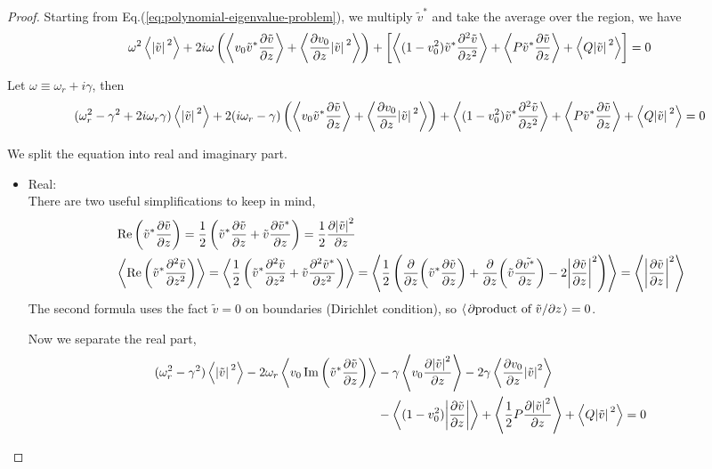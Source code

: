 \documentclass{article}
\theoremstyle{plain}
\theoremstyle{definition}
\theoremstyle{remark}
\theoremstyle{remark}
\begin{document}
\begin{proof}
    Starting from Eq.(\ref{eq:polynomial-eigenvalue-problem}), we multiply $\tilde{v}^*$ and take the average over the region, we have
\[ \omega^2 \expval{\abs*{\tilde{v}}^2} 
+ 2i\omega\left(\expval{v_0\tilde{v}^*\pdv{\tilde{v}}{z}} 
+ \expval{\pdv{v_0}{z}\abs*{\tilde{v}}^2}\right) 
+ \left[ \expval{(1-v_0^2)\tilde{v}^*\pdv[2]{\tilde{v}}{z} }
+ \expval{P\tilde{v}^*\pdv{\tilde{v}}{z} }
+ \expval{Q\abs*{\tilde{v}}^2} \right]
= 0  \]

Let $\omega \equiv \omega_r + i\gamma$, then
\[ (\omega_r^2-\gamma^2+2i\omega_r\gamma) \expval{\abs*{\tilde{v}}^2} 
+ 2(i\omega_r - \gamma)\left(\expval{v_0\tilde{v}^*\pdv{\tilde{v}}{z}} 
+ \expval{\pdv{v_0}{z}\abs*{\tilde{v}}^2}\right) 
+ \expval{(1-v_0^2)\tilde{v}^*\pdv[2]{\tilde{v}}{z} }
+ \expval{P\tilde{v}^*\pdv{\tilde{v}}{z} }
+ \expval{Q\abs*{\tilde{v}}^2}
= 0  \]

We split the equation into real and imaginary part.
\begin{itemize}
    \item Real: \\
    There are two useful simplifications to keep in mind,
    \begin{align*}
        &\Re\left(\tilde{v}^*\pdv{\tilde{v}}{z}\right) 
        = \frac{1}{2}\left(\tilde{v}^*\pdv{\tilde{v}}{z} + \tilde{v}\pdv{\tilde{v}^*}{z}\right) 
        = \frac{1}{2}\pdv{\abs{\tilde{v}}^2}{z} \\
        &\expval{\Re\left(\tilde{v}^*\pdv[2]{\tilde{v}}{z}\right) } 
        = \expval{\frac{1}{2}\left(\tilde{v}^*\pdv[2]{\tilde{v}}{z} + \tilde{v}\pdv[2]{\tilde{v}^*}{z}\right)}
        = \expval{\frac{1}{2}\left( \pdv{z}(\tilde{v}^*\pdv{\tilde{v}}{z}) + \pdv{z}(\tilde{v}\pdv{\tilde{v^*}}{z}) - 2\abs{\pdv{\tilde{v}}{z}}^2 \right)}
        = \expval{\abs{\pdv{\tilde{v}}{z}}^2}
    \end{align*}
    The second formula uses the fact $\tilde{v}=0$ on boundaries (Dirichlet condition), so $\expval{\pdv*{\text{product of }\tilde{v}}{z}} = 0$.

    Now we separate the real part,
    \begin{align*}
        (\omega_r^2-\gamma^2) \expval{\abs*{\tilde{v}}^2} 
        - 2\omega_r\expval{v_0 \Im\left(\tilde{v}^*\pdv{\tilde{v}}{z}\right)} 
        &- \gamma\expval{v_0 \pdv{\abs{\tilde{v}}^2}{z}} 
        - 2\gamma\expval{\pdv{v_0}{z}\abs{\tilde{v}}^2} \\
        &-\expval{(1-v_0^2) \abs{\pdv{\tilde{v}}{z}} }
        + \expval{\frac{1}{2}P\pdv{\abs{\tilde{v}}^2}{z}}
        + \expval{Q\abs*{\tilde{v}}^2} = 0
    \end{align*}


\end{itemize}
\end{proof}
\end{document}

